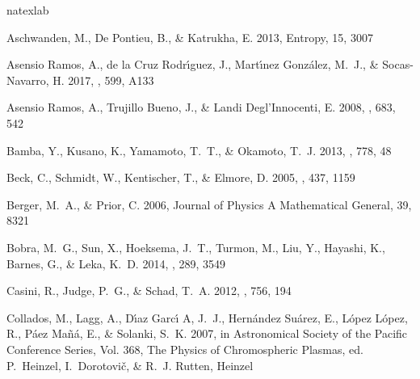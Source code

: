 \documentclass[manuscript]{aastex61}
\begin{document}
\begin{thebibliography}{59}
\expandafter\ifx\csname natexlab\endcsname\relax\def\natexlab#1{#1}\fi

{Aschwanden}, M., {De Pontieu}, B., \& {Katrukha}, E. 2013, Entropy, 15, 3007

{Asensio Ramos}, A., {de la Cruz Rodr{\'{\i}}guez}, J., {Mart{\'{\i}}nez
  Gonz{\'a}lez}, M.~J., \& {Socas-Navarro}, H. 2017, \aap, 599, A133

{Asensio Ramos}, A., {Trujillo Bueno}, J., \& {Landi Degl'Innocenti}, E. 2008,
  \apj, 683, 542

{Bamba}, Y., {Kusano}, K., {Yamamoto}, T.~T., \& {Okamoto}, T.~J. 2013, \apj,
  778, 48

{Beck}, C., {Schmidt}, W., {Kentischer}, T., \& {Elmore}, D. 2005, \aap, 437,
  1159

{Berger}, M.~A., \& {Prior}, C. 2006, Journal of Physics A Mathematical
  General, 39, 8321

{Bobra}, M.~G., {Sun}, X., {Hoeksema}, J.~T., {Turmon}, M., {Liu}, Y.,
  {Hayashi}, K., {Barnes}, G., \& {Leka}, K.~D. 2014, \solphys, 289, 3549

{Casini}, R., {Judge}, P.~G., \& {Schad}, T.~A. 2012, \apj, 756, 194

{Collados}, M., {Lagg}, A., {D{\'{\i}}az Garc{\'{\i}} A}, J.~J., {Hern{\'a}ndez
  Su{\'a}rez}, E., {L{\'o}pez L{\'o}pez}, R., {P{\'a}ez Ma{\~n}{\'a}}, E., \&
  {Solanki}, S.~K. 2007, in Astronomical Society of the Pacific Conference
  Series, Vol. 368, The Physics of Chromospheric Plasmas, ed. P.~{Heinzel},
  I.~{Dorotovi{\v c}}, \& R.~J. {Rutten}, Heinzel


\end{thebibliography}
\end{document}
